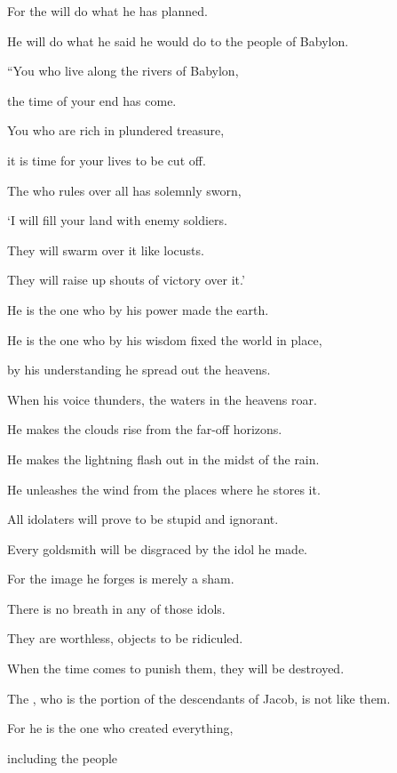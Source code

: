 {\par }{\Q For
the {}
will do what he has planned.
\par }{\Q He will do
what he said
he would do to
the people
of Babylon.
\par }{\Q {}“You who live
along the rivers
of Babylon,
\par }{\Q the time of your end
has come.
\par }{\Q You who are rich in plundered treasure,
\par }{\Q it is time for your lives to be cut off.
\par }{\Q {}The
{}
who rules over all
has solemnly sworn,
\par }{\Q ‘I will fill
your land with enemy soldiers.
\par }{\Q They will swarm
over
it like locusts.
\par }{\Q They will raise up shouts of victory over it.’
\par }{\Q {}He
is the one who by his power
made
the earth.
\par }{\Q He is the one who by his wisdom
fixed
the world
in place,
\par }{\Q by his understanding
he spread
out the heavens.
\par }{\Q {}When his voice
thunders,
the waters
in the heavens
roar.
\par }{\Q He makes the clouds rise from
the far-off horizons.
\par }{\Q He makes the lightning
flash out in the midst of the rain.
\par }{\Q He unleashes
the wind
from the places where he stores it.
\par }{\Q {}All
idolaters
will prove to be stupid and ignorant.
\par }{\Q Every
goldsmith
will be disgraced
by the idol
he made.
\par }{\Q For
the image
he forges is merely a sham.
\par }{\Q There is no
breath in any of those idols.
\par }{\Q {}They
are worthless,
objects
to be ridiculed.
\par }{\Q When the time
comes to punish
them, they will be destroyed.
\par }{\Q {}The
{}, who is the portion
of the descendants of Jacob,
is not
like them.
\par }{\Q For
he is the one who created
everything,
\par }{\Q including the people
}
